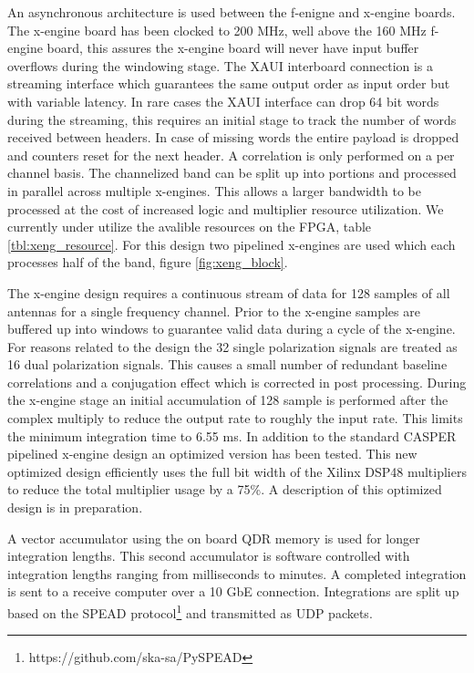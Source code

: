 \documentclass[useAMS,macros,usenatbib,onecolumn]{mn2e}
\begin{document}
An asynchronous architecture is used between the f-enigne and x-engine boards.
The x-engine board has been clocked to 200 MHz, well above the 160 MHz f-engine board, this assures the x-engine board will never have input buffer overflows during the windowing stage.
The XAUI interboard connection is a streaming interface which guarantees the same output order as input order but with variable latency.
In rare cases the XAUI interface can drop 64 bit words during the streaming, this requires an initial stage to track the number of words received between headers.
In case of missing words the entire payload is dropped and counters reset for the next header.
A correlation is only performed on a per channel basis.
The channelized band can be split up into portions and processed in parallel across multiple x-engines.
This allows a larger bandwidth to be processed at the cost of increased logic and multiplier resource utilization.
We currently under utilize the avalible resources on the FPGA, table \ref{tbl:xeng_resource}.
For this design two pipelined x-engines are used which each processes half of the band, figure \ref{fig:xeng_block}.

The x-engine design requires a continuous stream of data for 128 samples of all antennas for a single frequency channel.
Prior to the x-engine samples are buffered up into windows to guarantee valid data during a cycle of the x-engine.
For reasons related to the design the 32 single polarization signals are treated as 16 dual polarization signals.
This causes a small number of redundant baseline correlations and a conjugation effect which is corrected in post processing.
During the x-engine stage an initial accumulation of 128 sample is performed after the complex multiply to reduce the output rate to roughly the input rate.
This limits the minimum integration time to 6.55 ms.
In addition to the standard CASPER pipelined x-engine design an optimized version has been tested.
This new optimized design efficiently uses the full bit width of the Xilinx DSP48 multipliers to reduce the total multiplier usage by a 75\%.
A description of this optimized design is in preparation.

A vector accumulator using the on board QDR memory is used for longer integration lengths.
This second accumulator is software controlled with integration lengths ranging from milliseconds to minutes.
A completed integration is sent to a receive computer over a 10 GbE connection.
Integrations are split up based on the SPEAD protocol\footnote{https://github.com/ska-sa/PySPEAD} and transmitted as UDP packets.
\end{document}
